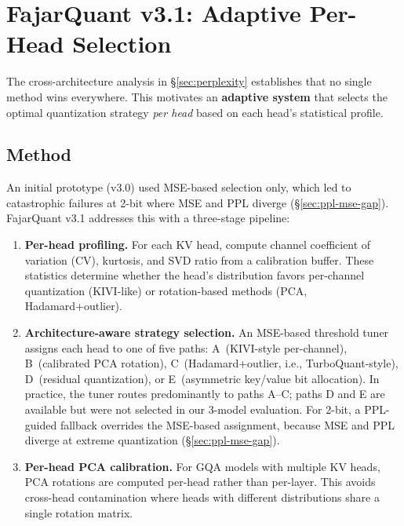 \documentclass{article}
\begin{document}
\section{FajarQuant v3.1: Adaptive Per-Head Selection}
\label{sec:v3}

The cross-architecture analysis in \S\ref{sec:perplexity} establishes
that no single method wins everywhere. This motivates an
\textbf{adaptive system} that selects the optimal quantization strategy
\emph{per head} based on each head's statistical profile.

\subsection{Method}

An initial prototype (v3.0) used MSE-based selection only, which led to
catastrophic failures at 2-bit where MSE and PPL diverge
(\S\ref{sec:ppl-mse-gap}). FajarQuant v3.1 addresses this with a
three-stage pipeline:

\begin{enumerate}[nosep]
\item \textbf{Per-head profiling.} For each KV head, compute channel
      coefficient of variation (CV), kurtosis, and SVD ratio from a
      calibration buffer. These statistics determine whether the head's
      distribution favors per-channel quantization (KIVI-like) or
      rotation-based methods (PCA, Hadamard+outlier).
\item \textbf{Architecture-aware strategy selection.} An MSE-based
      threshold tuner assigns each head to one of five paths:
      A~(KIVI-style per-channel), B~(calibrated PCA rotation),
      C~(Hadamard+outlier, i.e., TurboQuant-style), D~(residual
      quantization), or E~(asymmetric key/value bit allocation).
      In practice, the tuner routes predominantly to paths A--C;
      paths D and E are available but were not selected in our
      3-model evaluation. For 2-bit, a PPL-guided
      fallback overrides the MSE-based assignment, because MSE and PPL
      diverge at extreme quantization (\S\ref{sec:ppl-mse-gap}).
\item \textbf{Per-head PCA calibration.} For GQA models with multiple
      KV heads, PCA rotations are computed per-head rather than
      per-layer. This avoids cross-head contamination where heads with
      different distributions share a single rotation matrix.
\end{enumerate}
\end{document}
